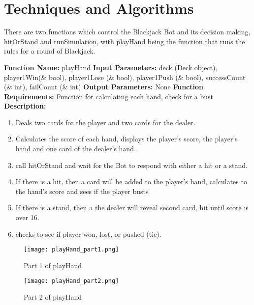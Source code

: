 {{\section{Techniques and Algorithms}
There are two functions which control the Blackjack Bot and its decision making, hitOrStand and runSimulation, with playHand being the function that runs the rules for a round of Blackjack. 
\newline
{\setlength{\parindent}{0cm}

\textbf{Function Name:} playHand
\newline
\textbf{Input Parameters:} deck (Deck object), player1Win(\& bool), player1Lose (\& bool), player1Push (\& bool), successCount (\& int), failCount (\& int)
\newline
\textbf{Output Parameters:} None
\newline
\textbf{Function Requirements:} Function for calculating each hand, check for a bust  
\newline
\textbf{Description: }
\begin{enumerate}
	\item Deals two cards for the player and two cards for the dealer.
	\item Calculates the score of each hand, displays the player's score, the player's hand and one card of the dealer's hand. 
	\item call hitOrStand and wait for the Bot to respond with either a hit or a stand.
	\item If there is a hit, then a card will be added to the player's hand, calculates to the hand's score and sees if the player busts
	\item If there is a stand, then a the dealer will reveal second card, hit until score is over 16.
	\item checks to see if player won, lost, or pushed (tie).
\end{enumerate}
\begin{figure}[H]
	\centering
	\texttt{[image: playHand\_part1.png]}\\
	\caption{Part 1 of playHand}
	\label{fig:tobias}
\end{figure}
\begin{figure}[H]
	\centering
	\texttt{[image: playHand\_part2.png]}\\
	\caption{Part 2 of playHand}
	\label{fig:tobias}
\end{figure}

}}}
